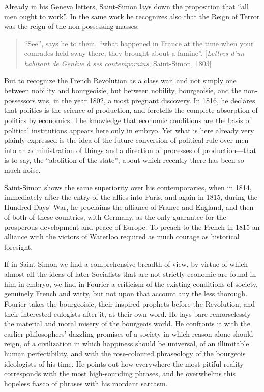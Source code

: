 Already in his Geneva letters, Saint-Simon lays down the proposition that ``all
men ought to work''. In the same work he recognizes also that the Reign of
Terror was the reign of the non-possessing masses.
%
\begin{quote}
  ``See'', says he to them, ``what happened in France at the time when your
  comrades held sway there; they brought about a famine''. [\emph{Lettres d’un
  habitant de Genève à ses contemporains}, Saint-Simon, 1803]
\end{quote}
%
But to recognize the French Revolution as a class war, and not simply one
between nobility and bourgeoisie, but between nobility, bourgeoisie, and the
non-possessors was, in the year 1802, a most pregnant discovery. In 1816, he
declares that politics is the science of production, and foretells the complete
absorption of politics by economics. The knowledge that economic conditions are
the basis of political institutions appears here only in embryo. Yet what is
here already very plainly expressed is the idea of the future conversion of
political rule over men into an administration of things and a direction of
processes of production---that is to say, the ``abolition of the state'', about
which recently there has been so much noise.

Saint-Simon shows the same superiority over his contemporaries, when in 1814,
immediately after the entry of the allies into Paris, and again in 1815, during
the Hundred Days' War, he proclaims the alliance of France and England, and then
of both of these countries, with Germany, as the only guarantee for the
prosperous development and peace of Europe. To preach to the French in 1815 an
alliance with the victors of Waterloo required as much courage as historical
foresight.

If in Saint-Simon we find a comprehensive breadth of view, by virtue of which
almost all the ideas of later Socialists that are not strictly economic are
found in him in embryo, we find in Fourier a criticism of the existing
conditions of society, genuinely French and witty, but not upon that account any
the less thorough. Fourier takes the bourgeoisie, their inspired prophets before
the Revolution, and their interested eulogists after it, at their own word. He
lays bare remorselessly the material and moral misery of the bourgeois world. He
confronts it with the earlier philosophers' dazzling promises of a society in
which reason alone should reign, of a civilization in which happiness should be
universal, of an illimitable human perfectibility, and with the rose-coloured
phraseology of the bourgeois ideologists of his time. He points out how
everywhere the most pitiful reality corresponds with the most high-sounding
phrases, and he overwhelms this hopeless fiasco of phrases with his mordant
sarcasm.

